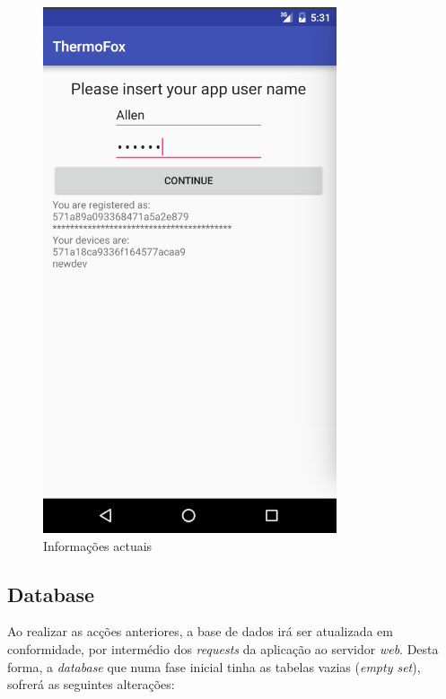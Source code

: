 \documentclass[a4paper]{article}
\begin{document}
\begin{figure}[H]
  \includegraphics[width=\linewidth]{show.png}
  \caption{Informações actuais}\label{fig:15}
\endminipage\hfill
\end{figure}


\subsection{Database}

Ao realizar as acções anteriores, a base de dados irá ser atualizada em conformidade, por intermédio dos \textit{requests} da aplicação ao servidor \textit{web}. Desta forma, a \textit{database} que numa fase inicial tinha as tabelas vazias (\textit{empty set}), sofrerá as seguintes alterações:
\end{document}

